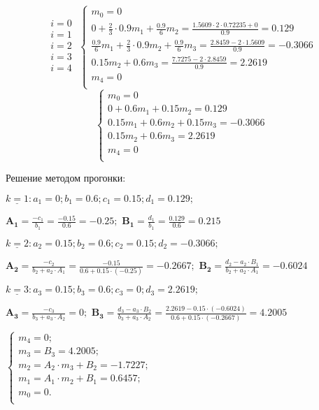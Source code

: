 \documentclass[10pt, a4paper]{scrartcl}
\begin{document}
\[\begin{matrix} i=0\;\\[4pt]  i=1\;\\[3pt] i=2\;\\[4pt] i=3\;\\[4pt] i=4\;\\[1pt] \end{matrix}\begin{cases}
m_0 = 0\\
0 + \frac{2}{3} \cdot 0.9m_1 + \frac{0.9}{6}m_2 = \frac{1.5609 \cdot 2 \cdot 0.72235 + 0}{0.9} = 0.129\\
\frac{0.9}{6}m_1 + \frac{2}{3} \cdot 0.9 m_2 + \frac{0.9}{6}m_3 = \frac{2.8459 - 2 \cdot 1.5609}{0.9} = -0.3066\\
0.15m_2 + 0.6m_3 = \frac{7.7275 - 2 \cdot 2.8459}{0.9} = 2.2619\\
m_4 = 0\\
\end{cases}\] \[\begin{cases}
m_0 = 0\\
0 + 0.6m_1 + 0.15m_2 = 0.129\\
0.15m_1 + 0.6 m_2 + 0.15m_3 = -0.3066\\
0.15m_2 + 0.6m_3 = 2.2619\\
m_4 = 0\\
\end{cases}\]

Решение методом прогонки:

\(\underline{k = 1}: a_1 = 0; b_1 = 0.6; c_1 = 0.15; d_1 = 0.129;\)

\(\displaystyle \mathbf{A_1} = \frac{-c_1}{b_1} = \frac{-0.15}{0.6} = -0.25;\)
\(\displaystyle \mathbf{B_1} = \frac{d_1}{b_1} = \frac{0.129}{0.6} = 0.215\)

\(\underline{k = 2}: a_2 = 0.15; b_2 = 0.6; c_2 = 0.15; d_2 = -0.3066;\)

\(\displaystyle \mathbf{A_2} = \frac{-c_2}{b_2 + a_2\cdot A_1} = \frac{-0.15}{0.6+0.15\cdot(-0.25)} = -0.2667;\)
\(\displaystyle \mathbf{B_2} = \frac{d_2 - a_2\cdot B_1}{b_2 + a_2\cdot A_1} = -0.6024\)

\(\underline{k = 3}: a_3 = 0.15; b_3 = 0.6; c_3 = 0; d_3 = 2.2619;\)

\(\displaystyle \mathbf{A_3} = \frac{-c_3}{b_3 + a_3\cdot A_2} = 0;\)
\(\displaystyle \mathbf{B_3} = \frac{d_3 - a_3\cdot B_2}{b_3 + a_3\cdot A_2} = \frac{2.2619 - 0.15 \cdot (-0.6024)}{0.6 + 0.15 \cdot (-0.2667)} = 4.2005\)

\(\displaystyle \begin{cases} m_4 = 0;\\ m_3 = B_3 = 4.2005;\\ m_2 = A_2 \cdot m_3 + B_2 = -1.7227;\\ m_1 = A_1 \cdot m_2 + B_1 = 0.6457;\\ m_0 = 0 .\\ \end{cases}\)
\end{document}
